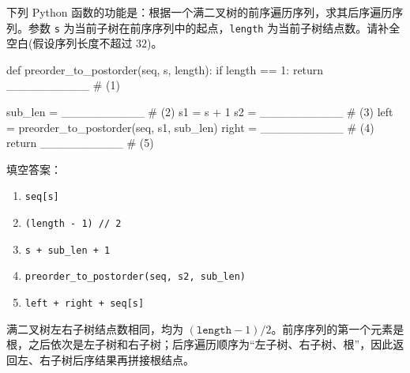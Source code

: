 \begin{question}[根据前序求后序]
下列 Python 函数的功能是：根据一个满二叉树的前序遍历序列，求其后序遍历序列。参数 \texttt{s} 为当前子树在前序序列中的起点，\texttt{length} 为当前子树结点数。请补全空白(假设序列长度不超过 $32$)。

\begin{pycode}
def preorder_to_postorder(seq, s, length):
    if length == 1:
        return __________                      # (1)

    sub_len = __________                       # (2)
    s1 = s + 1
    s2 = __________                            # (3)
    left = preorder_to_postorder(seq, s1, sub_len)
    right = __________                         # (4)
    return __________                          # (5)
\end{pycode}

\begin{solution}
填空答案：
\begin{enumerate}
  \item \texttt{seq[s]}
  \item \texttt{(length - 1) // 2}
  \item \texttt{s + sub\_len + 1}
  \item \texttt{preorder\_to\_postorder(seq, s2, sub\_len)}
  \item \texttt{left + right + seq[s]}
\end{enumerate}
满二叉树左右子树结点数相同，均为 $(\texttt{length}-1)/2$。前序序列的第一个元素是根，之后依次是左子树和右子树；后序遍历顺序为“左子树、右子树、根”，因此返回左、右子树后序结果再拼接根结点。
\end{solution}
\end{question}



